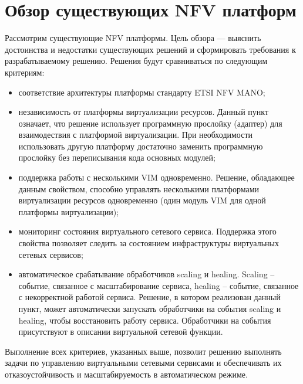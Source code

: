 \documentclass[oneside,final,14pt,a4paper]{extreport}
\begin{document}
\chapter{Обзор существующих NFV платформ}
\label{nfv_platform_overview}
Рассмотрим существующие NFV платформы. Цель обзора --- выяснить достоинства и недостатки существующих решений и сформировать требования к разрабатываемому решению. Решения будут сравниваться по следующим критериям:
\begin{itemize}
	\item соответствие архитектуры платформы стандарту ETSI NFV MANO;
	\item независимость от платформы виртуализации ресурсов. Данный пункт означает, что решение использует программную прослойку (адаптер) для взаимодествия с платформой виртуализации. При необходимости использовать другую платформу достаточно заменить программную прослойку без переписывания кода основных модулей;
	\item поддержка работы с несколькими VIM одновременно. Решение, обладающее данным свойством, способно управлять несколькими платформами виртуализации ресурсов одновременно (один модуль VIM для одной платформы виртуализации);
	\item мониторинг состояния виртуального сетевого сервиса. Поддержка этого свойства позволяет следить за состоянием инфраструктуры виртуальных сетевых сервисов;
	\item автоматическое срабатывание обработчиков scaling и healing. Scaling -- событие, связанное с масштабирование сервиса, healing -- событие, связанное с некорректной работой сервиса. Решение, в котором реализован данный пункт, может автоматически запускать обработчики на события scaling и healing, чтобы восстановить работу сервиса. Обработчики на события присутствуют в описании виртуальной сетевой функции.
\end{itemize}

Выполнение всех критериев, указанных выше, позволит решению выполнять задачи по управлению виртуальными сетевыми сервисами и обеспечивать их отказоустойчивость и масштабируемость в автоматическом режиме.
\end{document}
